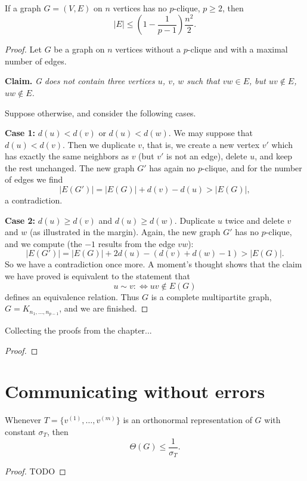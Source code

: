 \begin{theorem}
  \label{ch41proof5}
If a graph $G = (V, E)$ on $n$ vertices has no $p$-clique, $p \geq 2$, then
\[
|E| \leq \left(1 - \frac{1}{p - 1}\right) \frac{n^2}{2}. \tag{1}
\]
\end{theorem}
\begin{proof}
Let $G$ be a graph on $n$ vertices without a $p$-clique and with a maximal number of edges.

\textbf{Claim.} \textit{G does not contain three vertices $u$, $v$, $w$ such that $vw \in E$, but $uv \notin E$, $uw \notin E$.}

Suppose otherwise, and consider the following cases.

\textbf{Case 1:} $d(u) < d(v)$ or $d(u) < d(w)$.
We may suppose that $d(u) < d(v)$. Then we duplicate $v$, that is, we create a new vertex $v'$
which has exactly the same neighbors as $v$ (but $v'$ is not an edge), delete $u$, and keep the rest unchanged.
The new graph $G'$ has again no $p$-clique, and for the number of edges we find
\[
|E(G')| = |E(G)| + d(v) - d(u) > |E(G)|,
\]
a contradiction.

\textbf{Case 2:} $d(u) \geq d(v)$ and $d(u) \geq d(w)$.
Duplicate $u$ twice and delete $v$ and $w$ (as illustrated in the margin).
Again, the new graph $G'$ has no $p$-clique, and we compute (the $-1$ results from the edge $vw$):
\[
|E(G')| = |E(G)| + 2d(u) - (d(v) + d(w) - 1) > |E(G)|.
\]
So we have a contradiction once more.
A moment’s thought shows that the claim we have proved is equivalent to the statement that
\[
u \sim v : \iff uv \notin E(G)
\]
defines an equivalence relation. Thus $G$ is a complete multipartite graph, $G = K_{n_1, \dots, n_{p-1}}$,
and we are finished.
\end{proof}

\begin{theorem}
  \label{turan_graph}
  Collecting the proofs from the chapter...
\end{theorem}
\begin{proof}
\end{proof}


\chapter{Communicating without errors}

\begin{theorem}
  \label{ch42theorem}
  Whenever $T = \{v^{(1)}, \dots, v^{(m)}\}$ is an orthonormal representation of $G$ with constant $\sigma_T$, then
\[
\Theta(G) \leq \frac{1}{\sigma_T}.
\]
\end{theorem}
\begin{proof}
  TODO
\end{proof}


